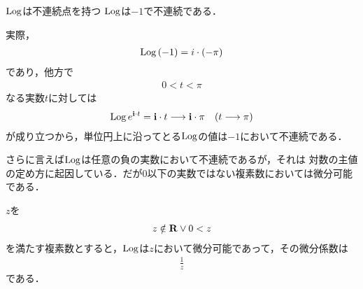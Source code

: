 	\begin{itembox}[l]{$\operatorname{Log}$は不連続点を持つ}
		$\operatorname{Log}$は$-1$で不連続である．
	\end{itembox}
	
	実際，
	\begin{align}
		\operatorname{Log}{(-1)} = i \cdot (-\pi)
	\end{align}
	であり，他方で
	\begin{align}
		0 < t < \pi
	\end{align}
	なる実数$t$に対しては
	\begin{align}
		\operatorname{Log}{e^{\mathbf{i} \cdot t}} = \mathbf{i} \cdot t
		\longrightarrow \mathbf{i} \cdot \pi
		\quad (t \longrightarrow \pi)
	\end{align}
	が成り立つから，単位円上に沿ってとる$\operatorname{Log}$の値は$-1$において不連続である．
	
	さらに言えば$\operatorname{Log}$は任意の負の実数において不連続であるが，それは
	対数の主値の定め方に起因している．だが$0$以下の実数ではない複素数においては微分可能である．
	
	\begin{screen}
		\begin{thm}
		\label{thm:pv_log_is_holomorphic}
			$z$を
			\begin{align}
				z \notin \mathbf{R} \vee 0 < z
			\end{align}
			を満たす複素数とすると，$\operatorname{Log}$は$z$において微分可能であって，その微分係数は
			\begin{align}
				\frac{1}{z}
			\end{align}
			である．
		\end{thm}
	\end{screen}
	
